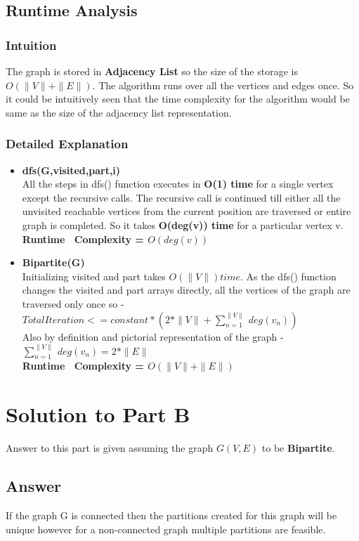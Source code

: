 \documentclass[20pt]{article}
\begin{document}
\newpage
\subsection{Runtime Analysis}
\subsubsection{Intuition}
The graph is stored in \textbf{Adjacency List} so the size of the storage is \\ 
\textbf{$O(\|V\|+\|E\|)$}. The algorithm runs over all the vertices and edges once. So it could be intuitively seen that the time complexity for the algorithm would be same as the size of the adjacency list representation.
\subsubsection{Detailed Explanation}
\begin{itemize}
\item \textbf{dfs(G,visited,part,i)} \\
All the steps in dfs() function executes in \textbf{O(1) time} for a single vertex except the recursive calls. The recursive call is continued till either all the unvisited reachable vertices from the current position are traversed or entire graph is completed. So it takes \textbf{O(deg(v)) time} for a particular vertex v. \\
\textbf{Runtime ~Complexity = $O(deg(v))$}
\item \textbf{Bipartite(G)} \\
Initializing visited and part takes \textbf{$O(\|V\|) time$}. As the dfs() function changes the visited and part arrays directly, all the vertices of the graph are traversed only once so - \\
$Total Iteration <= constant*(2*\|V\|+\sum_{n=1}^{\|V\|}~deg(v_n))$ \\
Also by definition and pictorial representation of the graph - \\
$\sum_{n=1}^{\|V\|}~deg(v_n) = 2*\|E\| $ \\
\textbf{Runtime ~Complexity = $O(\|V\|+\|E\|)$}
\end{itemize}

\newpage
\section{Solution to Part B}
Answer to this part is given assuming the graph $G(V,E)$ to be \textbf{Bipartite}.
\subsection{Answer}
If the graph G is connected then the partitions created for this graph will be unique however for a non-connected graph multiple partitions are feasible.
\end{document}
